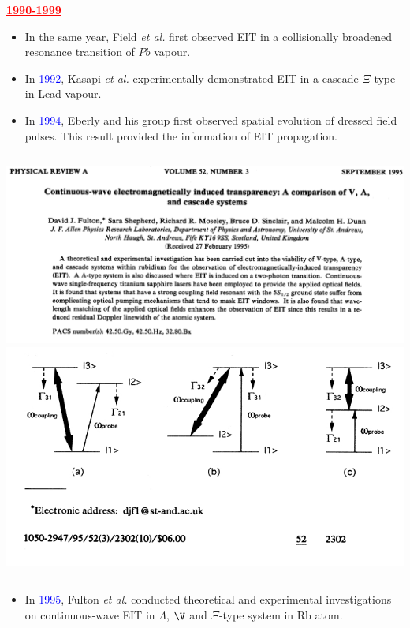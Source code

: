 \documentclass[9pt,aspectratio94]{beamer}
\begin{document}
\begin{frame}
    
 \begin{center}
      \textcolor{red}{\underline{ \textbf{1990-1999}}}
 \end{center}
    \begin{itemize}
        \item In the same year, Field \textit{et al.} first observed EIT in a collisionally broadened resonance transition of $Pb$ vapour.
       \item In \textcolor{blue}{1992},  Kasapi \textit{et al.} experimentally  demonstrated EIT in a cascade $\Xi$-type in Lead vapour.
       \item In \textcolor{blue}{1994}, Eberly and his group  first observed spatial evolution of dressed field pulses. This result provided the information of EIT propagation.
 \end{itemize}
\end{frame}
       \begin{frame}
       \begin{columns}
       \includegraphics[scale=0.35]{fulton1995-1-1.jpg}
       \includegraphics[scale=0.45]{pdfresizer.com-pdf-crop_page-0001.jpg}
       \end{columns}
           \begin{itemize}
      \item In \textcolor{blue}{1995}, Fulton \textit{et al.} conducted theoretical and experimental investigations on continuous-wave EIT in $\Lambda$, $\V$ and $\Xi$-type system in Rb atom.
      \end{itemize}
\end{frame}
\end{document}
